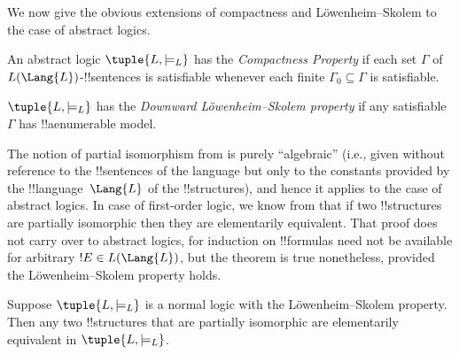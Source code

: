 \documentclass[../../../include/open-logic-section]{subfiles}
\begin{document}


We now give the obvious extensions of compactness and
L\"owenheim--Skolem to the case of abstract logics.

\begin{defn}
An abstract logic $\tuple{L, \models_L}$ has the \emph{Compactness
  Property} if each set $\Gamma$ of $L(\Lang{L})$-!!{sentence}s is
satisfiable whenever each finite $\Gamma_0 \subseteq \Gamma$ is
satisfiable.
\end{defn}

\begin{defn}
$\tuple{L, \models_L}$ has the \emph{Downward L\"owenheim--Skolem
  property} if any satisfiable $\Gamma$ has !!a{enumerable} model.
\end{defn}


The notion of partial isomorphism from
 is purely ``algebraic'' (i.e.,
given without reference to the !!{sentence}s of the language but only
to the constants provided by the !!{language}~$\Lang{L}$ of the
!!{structure}s), and hence it applies to the case of abstract
logics. In case of first-order logic, we know from
 that if two !!{structure}s are partially
isomorphic then they are elementarily equivalent. That proof does not
carry over to abstract logics, for induction on !!{formula}s need not
be available for arbitrary $!E \in L(\Lang{L})$, but the theorem is
true nonetheless, provided the L\"owenheim--Skolem property holds.

\begin{thm}
Suppose $\tuple{L, \models_L}$ is a normal logic with the
L\"owenheim--Skolem property. Then any two !!{structure}s that are
partially isomorphic are elementarily equivalent in $\tuple{L,
  \models_L}$.
\end{thm}
\end{document}
